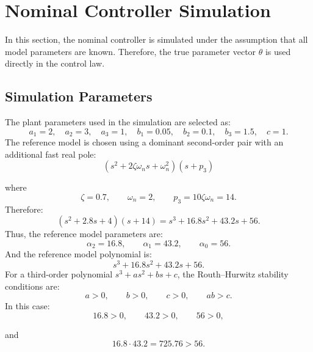 \section{Nominal Controller Simulation}

In this section, the nominal controller is simulated under the assumption that all model parameters are known. Therefore, the true parameter vector \(\theta\) is used directly in the control law.

\subsection{Simulation Parameters}

The plant parameters used in the simulation are selected as:
\begin{equation}
a_1=2,\quad
a_2=3,\quad
a_3=1,\quad
b_1=0.05,\quad
b_2=0.1,\quad
b_3=1.5,\quad
c=1.
\end{equation}
The reference model is chosen using a dominant second-order pair with an additional fast real pole:
\begin{equation}
\left(s^2+2\zeta\omega_n s+\omega_n^2\right)(s+p_3)
\end{equation}

where
\begin{equation}
\zeta=0.7,\qquad
\omega_n=2,\qquad
p_3=10\zeta\omega_n=14.
\end{equation}
Therefore:
\begin{equation}
\left(s^2+2.8s+4\right)(s+14)
=
s^3+16.8s^2+43.2s+56.
\end{equation}
Thus, the reference model parameters are:
\begin{equation}
\alpha_2=16.8,\qquad
\alpha_1=43.2,\qquad
\alpha_0=56.
\end{equation}
And the reference model polynomial is:
\begin{equation}
s^3+16.8s^2+43.2s+56.
\end{equation}
For a third-order polynomial
$s^3+a s^2+b s+c$,
the Routh--Hurwitz stability conditions are:
\begin{equation}
a>0,\qquad b>0,\qquad c>0,\qquad ab>c.
\end{equation}
In this case:
\begin{equation}
16.8>0,\qquad
43.2>0,\qquad
56>0,
\end{equation}

and
\begin{equation}
16.8\cdot43.2
=
725.76
>
56.
\end{equation}

